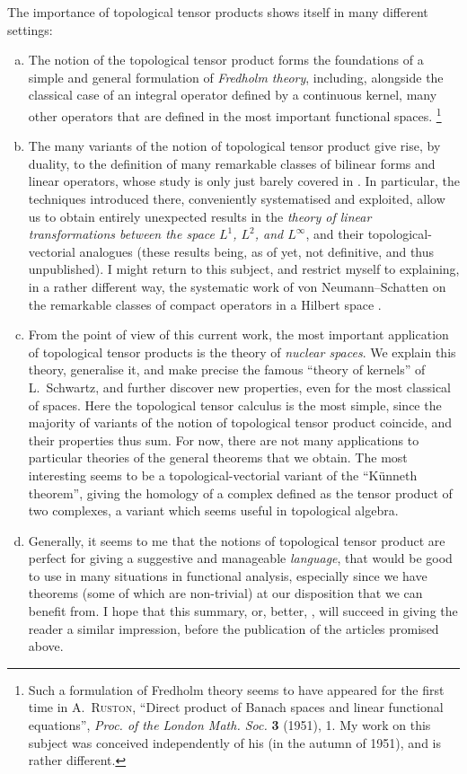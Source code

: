 \documentclass{article}
\theoremstyle{plain}
\newcommand{\oldpage}[1]{\marginpar{\footnotesize$\Big\vert$ \textit{p.~#1}}}
\begin{document}
The importance of topological tensor products shows itself in many different settings:
\begin{enumerate}[a)]
  \item The notion of the topological tensor product forms the foundations of a simple and general formulation of \emph{Fredholm theory}, including, alongside the classical case of an integral operator defined by a continuous kernel, many other operators that are defined in the most important functional spaces.%
    \footnote{Such a formulation of Fredholm theory seems to have appeared for the first time in \textsc{A.~Ruston}, ``Direct product of Banach spaces and linear functional equations'', \emph{Proc. of the London Math. Soc.} \textbf{3} (1951), 1. My work on this subject was conceived independently of his (in the autumn of 1951), and is rather different.}
  \item The many variants of the notion of topological tensor product give rise, by duality, to the definition of many remarkable classes of bilinear forms and linear operators, whose
\oldpage{74}
    study is only just barely covered in \cite[chap.~I, \S4]{PTT}.
    In particular, the techniques introduced there, conveniently systematised and exploited, allow us to obtain entirely unexpected results in the \emph{theory of linear transformations between the space $L^1$, $L^2$, and $L^\infty$}, and their topological-vectorial analogues (these results being, as of yet, not definitive, and thus unpublished).
    I might return to this subject, and restrict myself to explaining, in a rather different way, the systematic work of von Neumann--Schatten on the remarkable classes of compact operators in a Hilbert space \cite[chap.~4]{8}.
  \item From the point of view of this current work, the most important application of topological tensor products is the theory of \emph{nuclear spaces}.
    We explain this theory, generalise it, and make precise the famous ``theory of kernels'' of L.~Schwartz, and further discover new properties, even for the most classical of spaces.
    Here the topological tensor calculus is the most simple, since the majority of variants of the notion of topological tensor product coincide, and their properties thus sum.
    For now, there are not many applications to particular theories of the general theorems that we obtain.
    The most interesting seems to be a topological-vectorial variant of the ``K\"{u}nneth theorem'', giving the homology of a complex defined as the tensor product of two complexes, a variant which seems useful in topological algebra.
  \item Generally, it seems to me that the notions of topological tensor product are perfect for giving a suggestive and manageable \emph{language}, that would be good to use in many situations in functional analysis, especially since we have theorems (some of which are non-trivial) at our disposition that we can benefit from.
  I hope that this summary, or, better, \cite{PTT}, will succeed in giving the reader a similar impression, before the publication of the articles promised above.
\end{enumerate}
\end{document}
